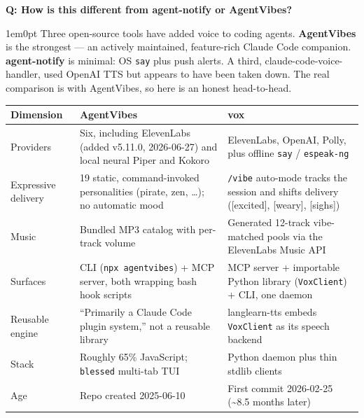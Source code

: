 \documentclass[11pt,letterpaper]{article}
\newcounter{faqnum}
\newenvironment{faqpair}[1]{%
  \needspace{4\baselineskip}%
  \vspace{0.5em}%
  \refstepcounter{faqnum}%
  \noindent\textbf{\color{SectionBlue}Q\thefaqnum: #1}\par\nopagebreak[4]%
  \vspace{0.2em}%
  \begin{adjustwidth}{1em}{0pt}%
  \setlength{\parindent}{0pt}%
}{%
  \end{adjustwidth}%
  \vspace{0.5em}%
}
\begin{document}
\begin{faqpair}{How is this different from agent-notify or AgentVibes?}\label{faq:competitors}
  Three open-source tools have added voice to coding agents. \textbf{AgentVibes}
  \cite{agentvibes2025} is the strongest --- an actively maintained, feature-rich
  Claude Code companion. \textbf{agent-notify} \cite{agentnotify2025} is minimal:
  OS \texttt{say} plus push alerts. A third, claude-code-voice-handler, used
  OpenAI TTS but appears to have been taken down. The real comparison is with
  AgentVibes, so here is an honest head-to-head.

  \begin{center}
  \small
  \renewcommand{\arraystretch}{1.3}
  \begin{tabularx}{\linewidth}{@{} l X X @{}}
  \toprule
  \textbf{\color{SectionBlue}Dimension} & \textbf{\color{SectionBlue}AgentVibes} & \textbf{\color{SectionBlue}vox} \\
  \midrule
  Providers &
    Six, including ElevenLabs (added v5.11.0, 2026-06-27) and local neural
    Piper and Kokoro \cite{agentvibes2026releasenotes,agentvibes2026providers} &
    ElevenLabs, OpenAI, Polly, plus offline \texttt{say} / \texttt{espeak-ng} \\
  Expressive delivery &
    19 static, command-invoked personalities (pirate, zen, \dots); no automatic
    mood \cite{agentvibes2026personalities} &
    \texttt{/vibe} auto-mode tracks the session and shifts delivery
    ([excited], [weary], [sighs]) \\
  Music &
    Bundled MP3 catalog with per-track volume &
    Generated 12-track vibe-matched pools via the ElevenLabs Music API \\
  Surfaces &
    CLI (\texttt{npx agentvibes}) + MCP server, both wrapping bash hook scripts
    \cite{agentvibes2026technicaldeepdive} &
    MCP server + importable Python library (\texttt{VoxClient}) + CLI, one daemon \\
  Reusable engine &
    ``Primarily a Claude Code plugin system,'' not a reusable library
    \cite{agentvibes2026technicaldeepdive} &
    langlearn-tts embeds \texttt{VoxClient} as its speech backend \\
  Stack &
    Roughly 65\% JavaScript; \texttt{blessed} multi-tab TUI
    \cite{agentvibes2026github} &
    Python daemon plus thin stdlib clients \\
  Age &
    Repo created 2025-06-10 \cite{agentvibes2026github} &
    First commit 2026-02-25 (\textasciitilde{}8.5 months later) \\
  \bottomrule
  \end{tabularx}
  \renewcommand{\arraystretch}{1.0}
  \end{center}


\end{faqpair}
\end{document}
